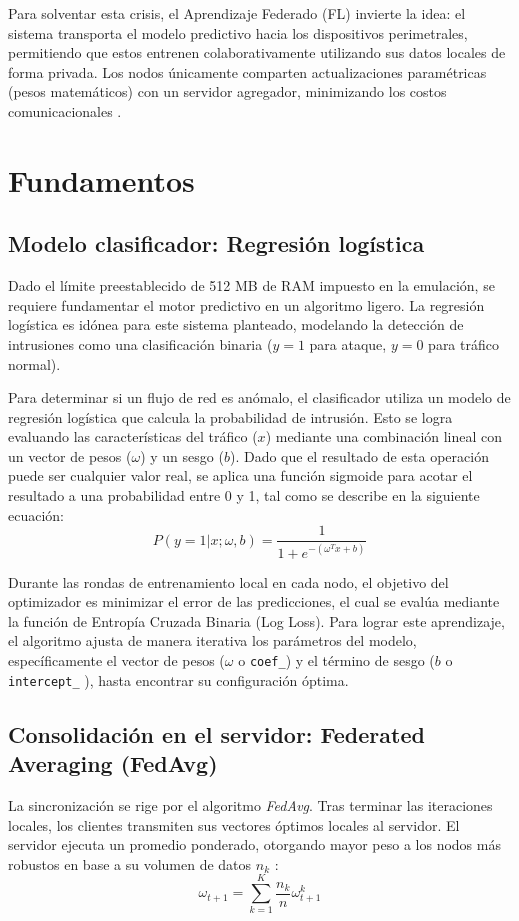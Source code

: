 \documentclass[12pt,a4paper]{article}
\begin{document}
Para solventar esta crisis, el Aprendizaje Federado (FL) invierte la idea: el sistema transporta el modelo predictivo hacia los dispositivos perimetrales, permitiendo que estos entrenen colaborativamente utilizando sus datos locales de forma privada. Los nodos únicamente comparten actualizaciones paramétricas (pesos matemáticos) con un servidor agregador, minimizando los costos comunicacionales \cite{kong2022}.

\section{Fundamentos}

\subsection{Modelo clasificador: Regresión logística}
Dado el límite preestablecido de 512 MB de RAM impuesto en la emulación, se requiere fundamentar el motor predictivo en un algoritmo ligero. La regresión logística es idónea para este sistema planteado, modelando la detección de intrusiones como una clasificación binaria ($y=1$ para ataque, $y=0$ para tráfico normal).

Para determinar si un flujo de red es anómalo, el clasificador utiliza un modelo de regresión logística que calcula la probabilidad de intrusión. Esto se logra evaluando las características del tráfico ($x$) mediante una combinación lineal con un vector de pesos ($\omega$) y un sesgo ($b$). Dado que el resultado de esta operación puede ser cualquier valor real, se aplica una función sigmoide para acotar el resultado a una probabilidad entre 0 y 1, tal como se describe en la siguiente ecuación:
\begin{equation}
P(y=1|x; \omega, b) = \frac{1}{1 + e^{-(\omega^T x + b)}}
\end{equation}

Durante las rondas de entrenamiento local en cada nodo, el objetivo del optimizador es minimizar el error de las predicciones, el cual se evalúa mediante la función de Entropía Cruzada Binaria (Log Loss). Para lograr este aprendizaje, el algoritmo ajusta de manera iterativa los parámetros del modelo, específicamente el vector de pesos ($\omega$ o \texttt{coef\_}) y el término de sesgo ($b$ o \texttt{intercept\_} ), hasta encontrar su configuración óptima.



\subsection{Consolidación en el servidor: Federated Averaging (FedAvg)}
La sincronización se rige por el algoritmo \textit{FedAvg}. Tras terminar las iteraciones locales, los clientes transmiten sus vectores óptimos locales al servidor. El servidor ejecuta un promedio ponderado, otorgando mayor peso a los nodos más robustos en base a su volumen de datos $n_k$ \cite{sun2023}:
\begin{equation}
\omega_{t+1} = \sum_{k=1}^{K} \frac{n_k}{n} \omega_{t+1}^k
\end{equation}
\end{document}
